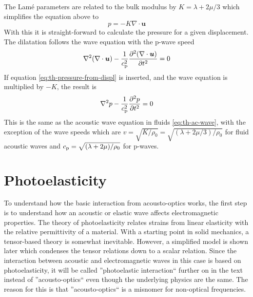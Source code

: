\documentclass[11pt,twoside]{eitExjobb}
\begin{document}
	The Lamé parameters are related to the bulk modulus by $K = \lambda + 2\mu/3$ \cite{Irgens2008} which simplifies the equation above to
	\begin{equation}
		p = -K \nabla \cdot \bm{u}
		\label{eq:th-pressure-from-displ}
	\end{equation}
	With this it is straight-forward to calculate the pressure for a given displacement. The dilatation follows the wave equation with the p-wave speed \cite{Schmerr2016}
	\begin{equation*}
		\nabla^2 (\nabla \cdot \bm{u}) - \frac{1}{c_{\mathrm{p}}^2} \frac{\partial^2 (\nabla \cdot \bm{u})}{\partial t^2} = 0
	\end{equation*}
	If equation \eqref{eq:th-pressure-from-displ} is inserted, and the wave equation is multiplied by $-K$, the result is
	\begin{equation*}
		\nabla^2 p - \frac{1}{c_{\mathrm{p}}^2} \frac{\partial^2 p}{\partial t^2} = 0
	\end{equation*}
	This is the same as the acoustic wave equation in fluids \eqref{eq:th-ac-wave}, with the exception of the wave speeds which are $v = \sqrt{K/\rho_0} = \sqrt{(\lambda + 2\mu/3)/\rho_0}$ for fluid acoustic waves and $c_{\mathrm{p}} = \sqrt{(\lambda + 2\mu)/\rho_0}$ for p-waves.
	
	
	\section{Photoelasticity}
	To understand how the basic interaction from acousto-optics works, the first step is to understand how an acoustic or elastic wave affects electromagnetic properties. The theory of photoelasticity relates strains from linear elasticity with the relative permittivity of a material. With a starting point in solid mechanics, a tensor-based theory is somewhat inevitable. However, a simplified model is shown later which condenses the tensor relations down to a scalar relation. Since the interaction between acoustic and electromagnetic waves in this case is based on photoelasticity, it will be called ''photoelastic interaction`` further on in the text instead of ''acousto-optics`` even though the underlying physics are the same. The reason for this is that ''acousto-optics`` is a misnomer for non-optical frequencies.
	
\end{document}
